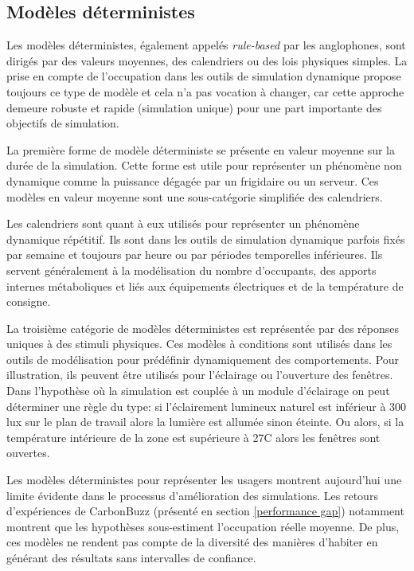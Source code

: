 \subsection{Modèles déterministes}
\label{Modèles déterministes}

Les modèles déterministes, également appelés \textit{rule-based} par les anglophones, sont dirigés par des valeurs moyennes, des calendriers ou des lois physiques simples. La prise en compte de l'occupation dans les outils de simulation dynamique propose toujours ce type de modèle et cela n'a pas vocation à changer, car cette approche demeure robuste et rapide (simulation unique) pour une part importante des objectifs de simulation. 

La première forme de modèle déterministe se présente en valeur moyenne sur la durée de la simulation. Cette forme est utile pour représenter un phénomène non dynamique comme la puissance dégagée par un frigidaire ou un serveur. Ces modèles en valeur moyenne sont une sous-catégorie simplifiée des calendriers.

Les calendriers sont quant à eux utilisés pour représenter un phénomène dynamique répétitif. Ils sont dans les outils de simulation dynamique parfois fixés par semaine et toujours par heure ou par périodes temporelles inférieures. Ils servent généralement à la modélisation du nombre d'occupants, des apports internes métaboliques et liés aux équipements électriques et de la température de consigne.

La troisième catégorie de modèles déterministes est représentée par des réponses uniques à des stimuli physiques. Ces modèles à conditions sont utilisés dans les outils de modélisation pour prédéfinir dynamiquement des comportements. Pour illustration, ils peuvent être utilisés pour l'éclairage ou l'ouverture des fenêtres. Dans l'hypothèse où la simulation est couplée à un module d'éclairage on peut déterminer une règle du type: si l'éclairement lumineux naturel est inférieur à 300 lux sur le plan de travail alors la lumière est allumée sinon éteinte. Ou alors, si la température intérieure de la zone est supérieure à 27\degre C alors les fenêtres  sont ouvertes.

Les modèles déterministes pour représenter les usagers montrent aujourd'hui une limite évidente dans le processus d'amélioration des simulations. Les retours d'expériences de CarbonBuzz (présenté en section \ref{performance gap}) notamment montrent que les hypothèses sous-estiment l'occupation réelle moyenne. De plus, ces modèles ne rendent pas compte de la diversité des manières d'habiter en générant des résultats sans intervalles de confiance.

